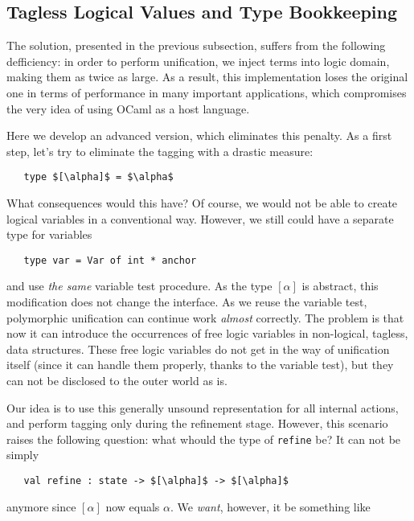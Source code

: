 \subsection{Tagless Logical Values and Type Bookkeeping}

The solution, presented in the previous subsection, suffers from the following defficiency: in order to perform unification,
we inject terms into logic domain, making them as twice as large. As a result, this implementation loses the original one in 
terms of performance in many important applications, which compromises the very idea of using OCaml as a host language.

Here we develop an advanced version, which eliminates this penalty. As a first step, let's try to eliminate the tagging with
a drastic measure:

\begin{lstlisting}
   type $[\alpha]$ = $\alpha$
\end{lstlisting}

What consequences would this have? Of course, we would not be able to create logical variables in a conventional way. However, 
we still could have a separate type for variables

\begin{lstlisting}
   type var = Var of int * anchor
\end{lstlisting}

and use \emph{the same} variable test procedure. As the type $[\alpha]$ is abstract, this modification does not change the interface. 
As we reuse the variable test, polymorphic unification can continue work \emph{almost} correctly. The problem is that
now it can introduce the occurrences of free logic variables in non-logical, tagless, data structures. These free logic variables 
do not get in the way of unification itself (since it can handle them properly, thanks to the variable test), but they can not
be disclosed to the outer world as is.

Our idea is to use this generally unsound representation for all internal actions, and perform tagging only during the refinement
stage. However, this scenario raises the following question: what whould the type of \lstinline{refine} be? It can not be simply

\begin{lstlisting}
   val refine : state -> $[\alpha]$ -> $[\alpha]$
\end{lstlisting}

anymore since $[\alpha]$ now equals $\alpha$. We \emph{want}, however, it be something like


